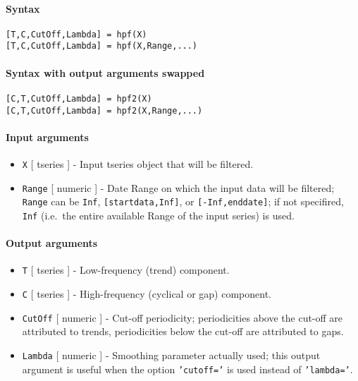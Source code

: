 


	\paragraph{Syntax}

\begin{verbatim}
[T,C,CutOff,Lambda] = hpf(X)
[T,C,CutOff,Lambda] = hpf(X,Range,...)
\end{verbatim}

\paragraph{Syntax with output arguments
swapped}

\begin{verbatim}
[C,T,CutOff,Lambda] = hpf2(X)
[C,T,CutOff,Lambda] = hpf2(X,Range,...)
\end{verbatim}

\paragraph{Input arguments}

\begin{itemize}
\item
  \texttt{X} {[} tseries {]} - Input tseries object that will be
  filtered.
\item
  \texttt{Range} {[} numeric {]} - Date Range on which the input data
  will be filtered; \texttt{Range} can be \texttt{Inf},
  \texttt{{[}startdata,Inf{]}}, or \texttt{{[}-Inf,enddate{]}}; if not
  specifired, \texttt{Inf} (i.e.~the entire available Range of the input
  series) is used.
\end{itemize}

\paragraph{Output arguments}

\begin{itemize}
\item
  \texttt{T} {[} tseries {]} - Low-frequency (trend) component.
\item
  \texttt{C} {[} tseries {]} - High-frequency (cyclical or gap)
  component.
\item
  \texttt{CutOff} {[} numeric {]} - Cut-off periodicity; periodicities
  above the cut-off are attributed to trends, periodicities below the
  cut-off are attributed to gaps.
\item
  \texttt{Lambda} {[} numeric {]} - Smoothing parameter actually used;
  this output argument is useful when the option \texttt{'cutoff='} is
  used instead of \texttt{'lambda='}.
\end{itemize}

